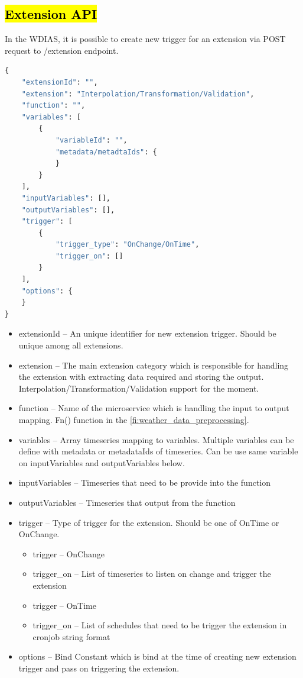 \subsection{\hl{Extension API}}
In the WDIAS, it is possible to create new trigger for an extension via POST request to /extension endpoint.
\begin{lstlisting}[language=Python]
{
    "extensionId": "",
    "extension": "Interpolation/Transformation/Validation",
    "function": "",
    "variables": [
        {
            "variableId": "",
            "metadata/metadtaIds": {
            }
        }
    ],
    "inputVariables": [],
    "outputVariables": [],
    "trigger": [
        {
            "trigger_type": "OnChange/OnTime",
            "trigger_on": []
        }
    ],
    "options": {
    }
}
\end{lstlisting}
\begin{itemize}
    \item extensionId -- An unique identifier for new extension trigger. Should be unique among all extensions.
    \item extension -- The main extension category which is responsible for handling the extension with extracting data required and storing the output. Interpolation/Transformation/Validation support for the moment.
    \item function -- Name of the microservice which is handling the input to output mapping. Fn() function in the \cref{fi:weather_data_preprocessing}.
    \item variables -- Array timeseries mapping to variables. Multiple variables can be define with metadata or metadataIds of timeseries. Can be use same variable on inputVariables and outputVariables below.
    \item inputVariables -- Timeseries that need to be provide into the function
    \item outputVariables -- Timeseries that output from the function
    \item trigger -- Type of trigger for the extension. Should be one of OnTime or OnChange.
    \begin{itemize}
        \item trigger -- OnChange
        \item trigger\_on -- List of timeseries to listen on change and trigger the extension
    \end{itemize}
    \begin{itemize}
        \item trigger -- OnTime
        \item trigger\_on -- List of schedules that need to be trigger the extension in cronjob string format
    \end{itemize}
    \item options -- Bind Constant which is bind at the time of creating new extension trigger and pass on triggering the extension.
\end{itemize}

